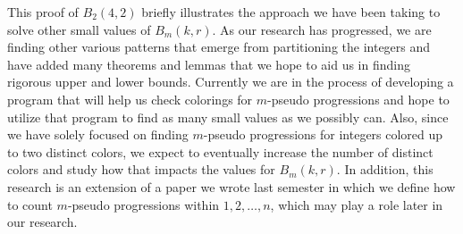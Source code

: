 \documentclass[ fontsize=10pt,twoside]{scrartcl}	%
\newtheorem{theorem}{Theorem}
\begin{document}
This proof of $B_2(4,2)$ briefly illustrates the approach we have been taking to solve other small values of $B_m(k,r)$. As our research has progressed, we are finding other various patterns that emerge from partitioning the integers and have added many theorems and lemmas that we hope to aid us in finding rigorous upper and lower bounds. Currently we are in the process of developing a program that will help us check colorings for $m$-pseudo progressions and hope to utilize that program to find as many small values as we possibly can. Also, since we have solely focused on finding $m$-pseudo progressions for integers colored up to two distinct colors, we expect to eventually increase the number of distinct colors and study how that impacts the values for $B_m(k,r)$. In addition, this research is an extension of a paper we wrote last semester in which we define how to count $m$-pseudo progressions within $1,2,\ldots,n$, which may play a role later in our research.

 

\end{document}
